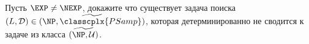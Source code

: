 Пусть $\EXP \neq \NEXP$, докажите что существует задача поиска
$(L, \mathcal{D}) \in \widetilde{(\NP, \classcplx{PSamp})}$, которая детерминированно не сводится к
задаче из класса $\widetilde{(\NP, \mathcal{U})}$.
